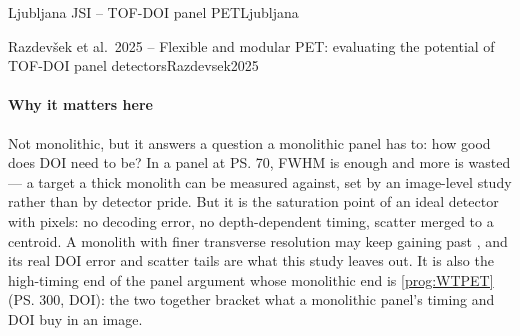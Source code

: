 \begin{programnote}{Ljubljana JSI -- TOF-DOI panel PET}{Ljubljana}
\begin{papernote}{Razdevšek et al.\ 2025 -- Flexible and modular PET: evaluating the potential of TOF-DOI panel detectors}{Razdevsek2025}
\paragraph{Why it matters here}
Not monolithic, but it answers a question a monolithic panel has to: how good
does DOI need to be? In a panel at \ps{70},  FWHM is enough and more is
wasted --- a target a thick monolith can be measured against, set by an
image-level study rather than by detector pride. But it is the saturation
point of an ideal detector with  pixels: no decoding error, no
depth-dependent timing, scatter merged to a centroid. A monolith with finer
transverse resolution may keep gaining past , and its real DOI error
and scatter tails are what this study leaves out. It is also the high-timing
end of the panel argument whose monolithic end is \ref{prog:WTPET}
(\ps{300},  DOI): the two together bracket what a monolithic panel's
timing and DOI buy in an image.

\end{papernote}

\end{programnote}

